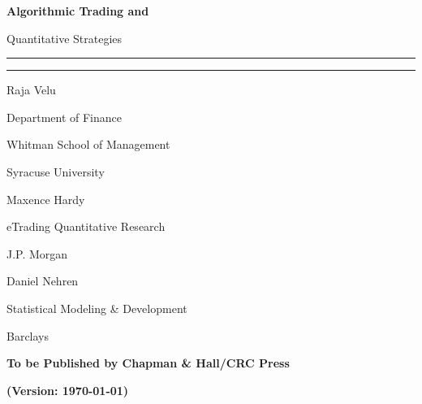 \thispagestyle{empty}
{\bfseries\Huge Algorithmic Trading and \par Quantitative Strategies}

\noindent\rule{\textwidth}{0.5pt} \par
\vspace{-0.3cm}\noindent\rule{0.25\textwidth}{4pt}


\vspace{0.5cm} 
\begin{minipage}{0.3\textwidth}
\large Raja Velu \par
{\scriptsize
Department of Finance \par
Whitman School of Management \par
Syracuse University \par
}
\end{minipage}%
\begin{minipage}{0.3\textwidth}
\large Maxence Hardy \par
{\scriptsize
eTrading Quantitative Research \par
J.P. Morgan \par
}
\end{minipage}%
\begin{minipage}{0.35\textwidth}
\large Daniel Nehren \par
{\scriptsize
Statistical Modeling \& Development \par 
Barclays \par
}
\end{minipage} \vfill

\begin{center} {\bfseries \Large To be Published by Chapman \& Hall/CRC Press} \end{center}

\vfill
\begin{center} \Huge {\bfseries (Version: \today)} \end{center}